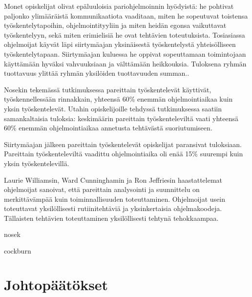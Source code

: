 \documentclass[finnish]{tktltiki2}
\theoremstyle{definition}
\theoremstyle{remark}
\begin{document}
Monet opiskelijat olivat epäluuloisia pariohjelmoinnin hyödyistä: he pohtivat paljonko ylimääräistä kommunikaatiota vaaditaan, miten he sopeutuvat toistensa työskentelytapoihin, ohjelmointityyliin ja miten heidän egonsa vaikuttavat työskentelyyn, sekä miten erimielisiä he ovat tehtävien toteutuksista. Tosiasiassa ohjelmoijat käyvät läpi siirtymäajan yksinäisestä työskentelystä yhteisölliseen työskentelytapaan. Siirtymäajan kuluessa he oppivat sopeuttamaan toimintojaan käyttämään hyväksi vahvuuksiaan ja välttämään heikkouksia. Tuloksena ryhmän tuottavuus ylittää ryhmän yksilöiden tuottavuuden summan.\cite{WIL00}.

Nosekin tekemässä tutkimuksessa pareittain työskentelevät käyttivät, työskennellessään rinnakkain, yhteensä 60\% enemmän ohjelmointiaikaa kuin yksin työskentelevät\cite{NOS98}. Utahin opiskelijoille tehdyssä tutkimuksessa saatiin samankaltaisia tuloksia: keskimäärin pareittain työskenteleviltä vaati yhteensä 60\% enemmän ohjelmointiaikaa annetusta tehtävästä suoriutumiseen\cite{WIL00}.

Siirtymäajan jälkeen pareittain työskentelevät opiskelijat paransivat tuloksiaan. Pareittain työskenteleviltä vaadittu ohjelmointiaika oli enää 15\% suurempi kuin yksin työskentelevillä\cite{WIL00}.



Laurie Williamsin, Ward Cunninghamin ja Ron Jeffriesin haastattelemat ohjelmoijat sanoivat, että pareittain analysointi ja suunnittelu on merkittävämpää kuin toiminnallisuuden toteuttaminen. Ohjelmoijat usein toteuttavat yksilöllisesti rutiinitehtäviä ja yksinkertaisia ohjelmakoodeja. Tällaisten tehtävien toteuttaminen yksilöllisesti tehtynä tehokkaampaa\cite{WIL00}.

nosek\cite{NOS98}

cockburn\cite{COC00a}

\section{Johtopäätökset}


%
%
% 
%



\end{document}
